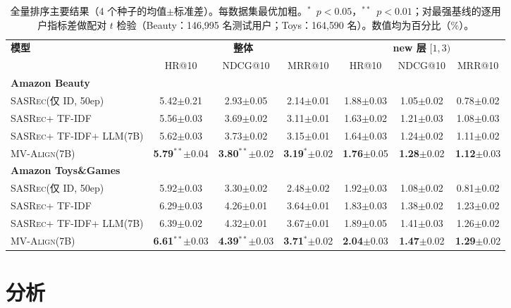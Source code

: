 \documentclass[sigconf,natbib=true,anonymous]{acmart}
\newcommand{\model}{\textsc{MV-Align}\xspace}
\newcommand{\base}{\textsc{SASRec}\xspace}
\newcommand{\tfidf}{\textsc{TF-IDF}\xspace}
\newcommand{\llm}{\textsc{LLM}\xspace}
\begin{document}
\begin{table}[t]
\caption{全量排序主要结果（4 个种子的均值$\pm$标准差）。每数据集最优加粗。$^{*}$~$p{<}0.05$，$^{**}$~$p{<}0.01$；对最强基线的逐用户指标差做配对 $t$ 检验（Beauty：146{,}995 名测试用户；Toys：164{,}590 名）。数值均为百分比（\%）。}
\label{tab:main}
\centering
\small
\begin{tabular}{lcccccc}
\toprule
\multirow{2}{*}{\textbf{模型}} &
\multicolumn{3}{c}{\textbf{整体}} &
\multicolumn{3}{c}{\textbf{new 层} $[1,3)$} \\
\cmidrule(lr){2-4}\cmidrule(lr){5-7}
& HR@10 & NDCG@10 & MRR@10 & HR@10 & NDCG@10 & MRR@10 \\
\midrule
\multicolumn{7}{l}{\textbf{Amazon Beauty}} \\
\base (仅 ID, 50ep) & 5.42$\pm$0.21 & 2.93$\pm$0.05 & 2.14$\pm$0.01 & 1.88$\pm$0.03 & 1.05$\pm$0.02 & 0.78$\pm$0.02 \\
\base + \tfidf & 5.56$\pm$0.03 & 3.69$\pm$0.02 & 3.11$\pm$0.01 & 1.63$\pm$0.02 & 1.21$\pm$0.03 & 1.08$\pm$0.03 \\
\base + \tfidf + \llm (7B) & 5.62$\pm$0.03 & 3.73$\pm$0.02 & 3.15$\pm$0.01 & 1.64$\pm$0.03 & 1.24$\pm$0.02 & 1.11$\pm$0.02 \\
\model (7B) & \textbf{5.79}$^{**}$$\pm$0.04 & \textbf{3.80}$^{**}$$\pm$0.02 & \textbf{3.19}$^{*}$$\pm$0.02 & \textbf{1.76}$\pm$0.05 & \textbf{1.28}$\pm$0.02 & \textbf{1.12}$\pm$0.03 \\
\midrule
\multicolumn{7}{l}{\textbf{Amazon Toys\&Games}} \\
\base (仅 ID, 50ep) & 5.92$\pm$0.03 & 3.30$\pm$0.02 & 2.48$\pm$0.02 & 1.92$\pm$0.03 & 1.08$\pm$0.02 & 0.81$\pm$0.02 \\
\base + \tfidf & 6.29$\pm$0.03 & 4.26$\pm$0.01 & 3.64$\pm$0.01 & 1.83$\pm$0.03 & 1.38$\pm$0.02 & 1.23$\pm$0.02 \\
\base + \tfidf + \llm (7B) & 6.39$\pm$0.02 & 4.32$\pm$0.01 & 3.67$\pm$0.01 & 1.89$\pm$0.05 & 1.41$\pm$0.03 & 1.26$\pm$0.02 \\
\model (7B) & \textbf{6.61}$^{**}$$\pm$0.03 & \textbf{4.39}$^{**}$$\pm$0.03 & \textbf{3.71}$^{*}$$\pm$0.02 & \textbf{2.04}$\pm$0.03 & \textbf{1.47}$\pm$0.02 & \textbf{1.29}$\pm$0.02 \\
\bottomrule
\end{tabular}
\end{table}

\section{分析}\label{sec:analysis}
\end{document}
